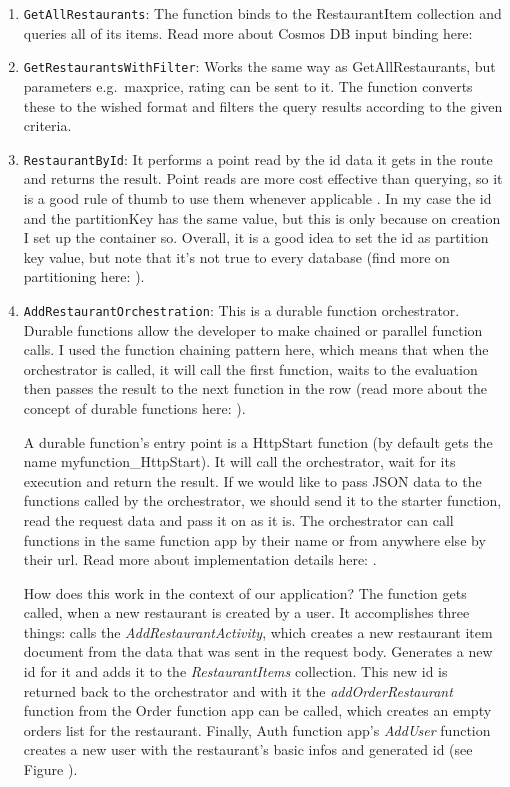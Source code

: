 \begin{enumerate}
	\item \verb+GetAllRestaurants+: The function binds to the RestaurantItem collection and queries all of its items. Read more about Cosmos DB input binding here: \cite{CosmosDBInputBinding}
	\item \verb+GetRestaurantsWithFilter+: Works the same way as GetAllRestaurants, but parameters e.g.\ maxprice, rating can be sent to it. The function converts these to the wished format and filters the query results according to the given criteria.
	
	\item \verb+RestaurantById+: 
	It performs a point read by the id data it gets in the route and returns the result. Point reads are more cost effective than querying, so it is a good rule of thumb to use them whenever applicable \cite{CosmosDBCostOpt}. In my case the id and the partitionKey has the same value, but this is only because on creation I set up the container so. Overall, it is a good idea to set the id as partition key value, but note that it's not true to every database (find more on partitioning here: \cite{CosmosDBPartitioning}). 
	
	\item \verb+AddRestaurantOrchestration+: 
	This is a durable function orchestrator. Durable functions allow the developer to make chained or parallel function calls. I used the function chaining pattern here, which means that when the orchestrator is called, it will call the first function, waits to the evaluation then passes the result to the next function in the row (read more about the concept of durable functions here: \cite{DurableFunctions}).
	
	A durable function's entry point is a HttpStart function (by default gets the name myfunction\_HttpStart). It will call the orchestrator, wait for its execution and return the result. If we would like to pass JSON data to the functions called by the orchestrator, we should send it to the starter function, read the request data and pass it on as it is. The orchestrator can call functions in the same function app by their name or from anywhere else by their url. Read more about implementation details here: \cite{DurableFunctionsImplement}.
	
	How does this work in the context of our application? The function gets called, when a new restaurant is created by a user. It accomplishes three things: calls the \emph{AddRestaurantActivity}, which creates a new restaurant item document from the data that was sent in the request body. Generates a new id for it and adds it to the \emph{RestaurantItems} collection. This new id is returned back to the orchestrator and with it the \emph{addOrderRestaurant} function from the Order function app can be called, which creates an empty orders list for the restaurant. Finally, Auth function app's \emph{AddUser} function creates a new user with the restaurant's basic infos and generated id (see Figure ).	
	

\end{enumerate}
